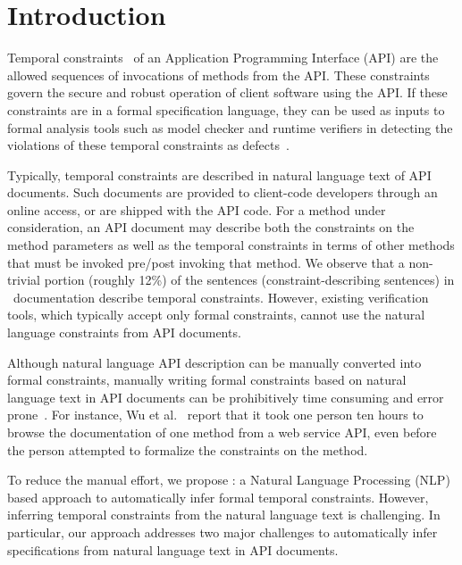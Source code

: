 \section{Introduction}
\label{sec:introduction}


Temporal constraints~\cite{ball2002s} of an Application Programming Interface (API) 
are the allowed sequences of invocations of methods from the API. 
These constraints govern the secure and robust operation of client software using the API.
If these constraints are in a formal specification language,
they can be used as inputs to formal analysis tools such 
as model checker and runtime verifiers
in detecting the violations of these temporal constraints as defects~\cite{lee2012towards}.

Typically, temporal constraints are described in natural language text of API documents.
Such documents are provided to client-code developers through an online access, or are shipped with the API code.
For a method under consideration, an API document may describe both the constraints on the method parameters
as well as the temporal constraints in terms of other methods that must be invoked pre/post invoking that method.
We observe that a non-trivial portion (roughly 12\%) of the sentences (constraint-describing sentences)
in \amazonAPI\ documentation describe temporal constraints.
However, existing verification tools, which typically accept only formal constraints,
cannot use the natural language constraints from API documents.

Although natural language API description can be manually converted into formal constraints,
manually writing formal constraints based on natural language text in API documents can be prohibitively time consuming and error prone~\cite{wu2013inferring,RubingerWEB10}. 
For instance, Wu et al.~\cite{wu2013inferring} report that it took one person ten hours to browse the documentation of one method from a web service API, even before the person attempted to formalize the constraints on the method.


To reduce the manual effort, we propose \tool: a Natural Language Processing (NLP) based approach
to automatically infer formal temporal constraints. 
However, inferring temporal constraints from the natural language text is challenging. 
In particular, our approach addresses two major challenges to automatically infer specifications
from natural language text in API documents.

